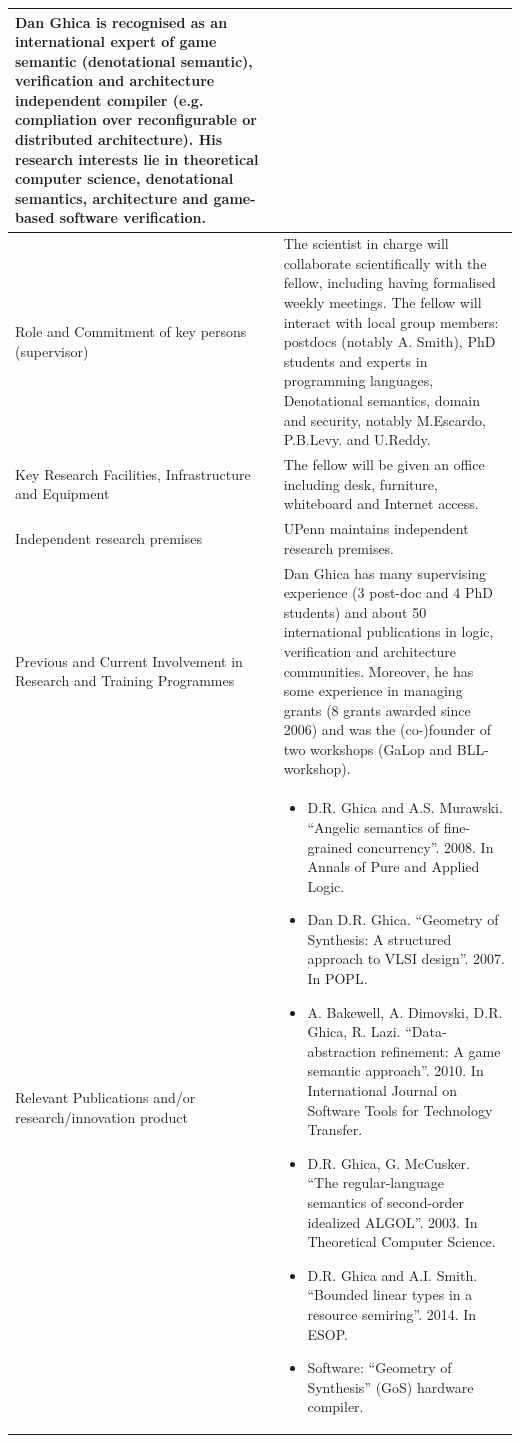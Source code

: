 \documentclass{article}[11pt]
\begin{document}
{\begin{tabular}{| l | l |}
{       Dan Ghica is recognised as an international expert of game
       semantic (denotational semantic), verification and architecture independent compiler (e.g. compliation over reconfigurable 
       or distributed architecture). His research interests lie in theoretical computer science, denotational semantics,
       architecture and game-based software verification.
    } \\
    \hline
    \parbox[c]{4cm}{Role and Commitment of key persons (supervisor)} & 
    \parbox[c]{14cm}{
      The scientist in charge will collaborate scientifically with the fellow, including having formalised weekly meetings. The fellow will interact with local group members:  postdocs (notably A. Smith), PhD students and experts in programming languages, Denotational semantics, domain and security, notably M.Escardo, P.B.Levy. and U.Reddy. 
    } \\
    \hline
    \parbox[c]{4cm}{Key  Research  Facilities,   Infrastructure and Equipment} & \parbox[c]{14cm}{The fellow will be given an office including desk, furniture, whiteboard and Internet access.} \\
    \hline
    \parbox[c]{4cm}{Independent research premises} &  \parbox[c]{14cm}{UPenn maintains independent research premises.}\\
    \hline
    \parbox[c]{4cm}{Previous and Current Involvement in Research and Training Programmes} & 
    \parbox[c]{14cm}{Dan Ghica has many supervising experience (3 post-doc and 4 PhD students) and about 50 international publications 
      in logic, verification and architecture communities. Moreover, he has some experience in managing grants (8 grants awarded since 2006) and was the (co-)founder of two workshops (GaLop and BLL-workshop).
    } \\
    \hline
    \parbox[c]{4cm}{Relevant  Publications  and/or\\  research/innovation product} & 
    \parbox[c]{14cm}{
      \begin{itemize}[leftmargin=0.5em, itemsep=0em]
      \item D.R. Ghica and A.S. Murawski. “Angelic semantics of fine-grained concurrency”. 2008. In Annals of Pure and Applied Logic.
      \item Dan D.R. Ghica. “Geometry of Synthesis: A structured approach to VLSI design”. 2007. In POPL.
      \item A. Bakewell, A. Dimovski, D.R. Ghica, R. Lazi. “Data-abstraction refinement: A game semantic approach”. 2010. In International Journal on Software Tools for Technology Transfer.
      \item D.R. Ghica, G. McCusker. “The regular-language semantics of second-order idealized ALGOL”. 2003. In Theoretical Computer Science.
      \item D.R. Ghica and A.I. Smith. ``Bounded linear types in a resource semiring''. 2014. In ESOP.
      \item Software: “Geometry of Synthesis” (GoS) hardware compiler. 
      \end{itemize}
    } \\
    \hline
  \end{tabular}
}
\end{document}
